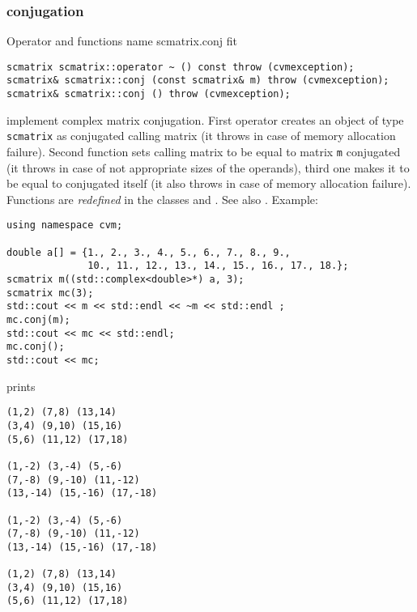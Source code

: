 \subsubsection{conjugation}
Operator and functions%
\pdfdest name {scmatrix.conj} fit
\begin{verbatim}
scmatrix scmatrix::operator ~ () const throw (cvmexception);
scmatrix& scmatrix::conj (const scmatrix& m) throw (cvmexception);
scmatrix& scmatrix::conj () throw (cvmexception);
\end{verbatim}
implement complex matrix conjugation.
First operator creates an object of type \verb"scmatrix" as
 conjugated calling matrix
(it throws  
in case of memory allocation failure). 
Second function sets  calling matrix to be equal to  matrix
\verb"m" conjugated
(it throws  
in case of not appropriate sizes of the operands), 
third one makes it to be equal to
conjugated itself (it also throws  
in case of memory allocation failure). 
Functions are \emph{redefined} in the classes
and .
See also .
Example:
\begin{Verbatim}
using namespace cvm;

double a[] = {1., 2., 3., 4., 5., 6., 7., 8., 9.,
              10., 11., 12., 13., 14., 15., 16., 17., 18.};
scmatrix m((std::complex<double>*) a, 3);
scmatrix mc(3);
std::cout << m << std::endl << ~m << std::endl ;
mc.conj(m);
std::cout << mc << std::endl;
mc.conj();
std::cout << mc;
\end{Verbatim}
prints
\begin{Verbatim}
(1,2) (7,8) (13,14)
(3,4) (9,10) (15,16)
(5,6) (11,12) (17,18)

(1,-2) (3,-4) (5,-6)
(7,-8) (9,-10) (11,-12)
(13,-14) (15,-16) (17,-18)

(1,-2) (3,-4) (5,-6)
(7,-8) (9,-10) (11,-12)
(13,-14) (15,-16) (17,-18)

(1,2) (7,8) (13,14)
(3,4) (9,10) (15,16)
(5,6) (11,12) (17,18)
\end{Verbatim}
\newpage





